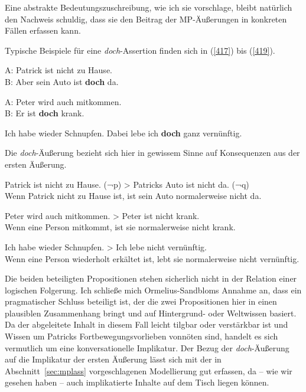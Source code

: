 Eine abstrakte Bedeutungszuschreibung, wie ich sie vorschlage, bleibt natürlich den Nachweis schuldig, dass sie den Beitrag der MP-Äußerungen in konkreten Fällen erfassen kann.

Typische Beispiele für eine \textit{doch}-Assertion finden sich in (\ref{417}) bis (\ref{419}).

\begin{exe}
	\ex\label{417} 
	A: Patrick ist nicht zu Hause.\\
	B: Aber sein Auto ist \textbf{doch} da.	
	\hfill\hbox{\citet[83]{Ormelius-Sandblom1997}}
\end{exe}

\begin{exe}
	\ex\label{418} 
	A: Peter wird auch mitkommen.\\
	B: Er ist \textbf{doch} krank.
	\hfill\hbox{\citet[126]{Egg2013}}
\end{exe}

\begin{exe}
	\ex\label{419} 
	Ich habe wieder Schnupfen. Dabei lebe ich \textbf{doch} ganz vernünftig.
	\newline
	\hbox{}\hfill\hbox{\citet[84]{Dahl1988}}	
\end{exe}
Die \textit{doch}-Äußerung bezieht sich hier in gewissem Sinne auf Konsequenzen aus der ersten Äußerung. 

\begin{exe}
	\ex\label{420} 
	Patrick ist nicht zu Hause. (¬p) > Patricks Auto ist nicht da. (¬q)\\
	Wenn Patrick nicht zu Hause ist, ist sein Auto normalerweise nicht da. 	
\end{exe}

\begin{exe}
	\ex\label{421} 
	Peter wird auch mitkommen. > Peter ist nicht krank.\\
	Wenn eine Person mitkommt, ist sie normalerweise nicht krank. 
\end{exe}		
		 
\begin{exe}
	\ex\label{422} 
	Ich habe wieder Schnupfen. > Ich lebe nicht vernünftig.\\
	Wenn eine Person wiederholt erkältet ist, lebt sie normalerweise nicht vernünftig.  	
\end{exe}
Die beiden beteiligten Propositionen stehen sicherlich nicht in der Relation einer logischen Folgerung. Ich schließe mich Ormelius-Sandbloms Annahme an, dass ein pragmatischer Schluss beteiligt ist, der die zwei Propositionen hier in einen plausiblen Zusammenhang bringt und auf Hintergrund- oder Weltwissen basiert. Da der abgeleitete Inhalt in diesem Fall leicht tilgbar oder verstärkbar ist und Wissen um Patricks Fortbewegungsvorlieben vonnöten sind, handelt es sich vermutlich um eine  konversationelle Implikatur. Der Bezug der \textit{doch}-Äußerung auf die Implikatur der ersten Äußerung lässt sich mit der in Abschnitt~\ref{sec:mplass} vorgeschlagenen Modellierung gut erfassen, da -- wie wir gesehen haben -- auch implikatierte Inhalte auf dem Tisch liegen können.

